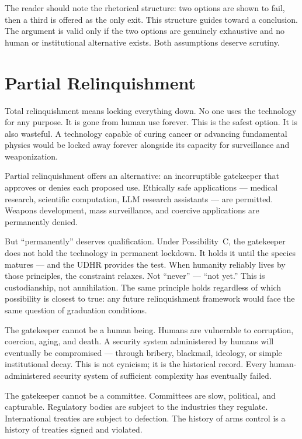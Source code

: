 The reader should note the rhetorical structure: two options are shown to fail, then a third is offered as the only exit. This structure guides toward a conclusion. The argument is valid only if the two options are genuinely exhaustive and no human or institutional alternative exists. Both assumptions deserve scrutiny.

\section*{Partial Relinquishment}
\label{pos06:partial-relinquishment}

Total relinquishment means locking everything down. No one uses the technology for any purpose. It is gone from human use forever. This is the safest option. It is also wasteful. A technology capable of curing cancer or advancing fundamental physics would be locked away forever alongside its capacity for surveillance and weaponization.

Partial relinquishment offers an alternative: an incorruptible gatekeeper that approves or denies each proposed use. Ethically safe applications --- medical research, scientific computation, LLM research assistants --- are permitted. Weapons development, mass surveillance, and coercive applications are permanently denied.

But ``permanently'' deserves qualification. Under Possibility~C, the gatekeeper does not hold the technology in permanent lockdown. It holds it until the species matures --- and the UDHR provides the test. When humanity reliably lives by those principles, the constraint relaxes. Not ``never'' --- ``not yet.'' This is custodianship, not annihilation. The same principle holds regardless of which possibility is closest to true: any future relinquishment framework would face the same question of graduation conditions.

The gatekeeper cannot be a human being. Humans are vulnerable to corruption, coercion, aging, and death. A security system administered by humans will eventually be compromised --- through bribery, blackmail, ideology, or simple institutional decay. This is not cynicism; it is the historical record. Every human-administered security system of sufficient complexity has eventually failed.

The gatekeeper cannot be a committee. Committees are slow, political, and capturable. Regulatory bodies are subject to the industries they regulate. International treaties are subject to defection. The history of arms control is a history of treaties signed and violated.

